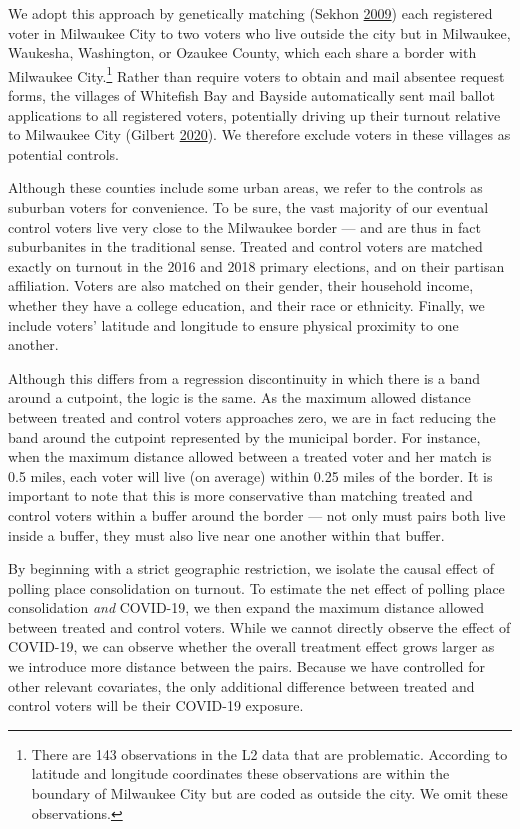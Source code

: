\documentclass[
  12pt,
]{article}
\begin{document}
We adopt this approach by genetically matching (Sekhon \protect\hyperlink{ref-Sekhon2009}{2009}) each registered voter in Milwaukee City to two voters who live outside the city but in Milwaukee, Waukesha, Washington, or Ozaukee County, which each share a border with Milwaukee City.\footnote{There are 143 observations in the L2 data that are problematic. According to latitude and longitude coordinates these observations are within the boundary of Milwaukee City but are coded as outside the city. We omit these observations.} Rather than require voters to obtain and mail absentee request forms, the villages of Whitefish Bay and Bayside automatically sent mail ballot applications to all registered voters, potentially driving up their turnout relative to Milwaukee City (Gilbert \protect\hyperlink{ref-Gilbert2020}{2020}). We therefore exclude voters in these villages as potential controls.

Although these counties include some urban areas, we refer to the controls as suburban voters for convenience. To be sure, the vast majority of our eventual control voters live very close to the Milwaukee border --- and are thus in fact suburbanites in the traditional sense. Treated and control voters are matched exactly on turnout in the 2016 and 2018 primary elections, and on their partisan affiliation. Voters are also matched on their gender, their household income, whether they have a college education, and their race or ethnicity. Finally, we include voters' latitude and longitude to ensure physical proximity to one another.

Although this differs from a regression discontinuity in which there is a band around a cutpoint, the logic is the same. As the maximum allowed distance between treated and control voters approaches zero, we are in fact reducing the band around the cutpoint represented by the municipal border. For instance, when the maximum distance allowed between a treated voter and her match is 0.5 miles, each voter will live (on average) within 0.25 miles of the border. It is important to note that this is more conservative than matching treated and control voters within a buffer around the border --- not only must pairs both live inside a buffer, they must also live near one another within that buffer.

By beginning with a strict geographic restriction, we isolate the causal effect of polling place consolidation on turnout. To estimate the net effect of polling place consolidation \emph{and} COVID-19, we then expand the maximum distance allowed between treated and control voters. While we cannot directly observe the effect of COVID-19, we can observe whether the overall treatment effect grows larger as we introduce more distance between the pairs. Because we have controlled for other relevant covariates, the only additional difference between treated and control voters will be their COVID-19 exposure.
\end{document}
